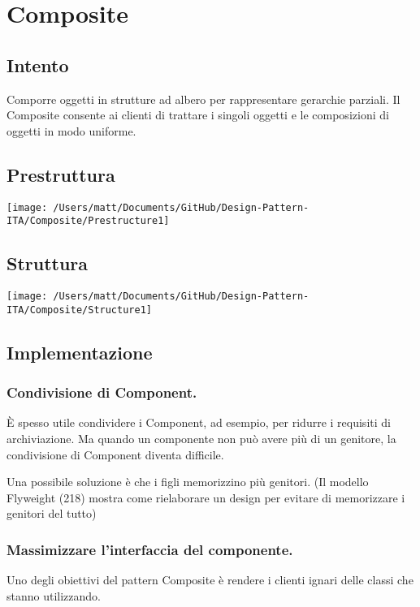 \chapter{Composite}
\section{Intento}

Comporre oggetti in strutture ad albero per rappresentare gerarchie parziali. Il Composite consente ai clienti di trattare i singoli oggetti e le composizioni di oggetti in modo uniforme.


\section{Prestruttura}

\texttt{[image: /Users/matt/Documents/GitHub/Design-Pattern-ITA/Composite/Prestructure1]}


\section{Struttura}

\texttt{[image: /Users/matt/Documents/GitHub/Design-Pattern-ITA/Composite/Structure1]}


\section{Implementazione}

\subsection{Condivisione di Component.}
È spesso utile condividere i Component, ad esempio, per ridurre i requisiti di archiviazione. Ma quando un componente non può avere più di un genitore, la condivisione di Component diventa difficile.

Una possibile soluzione è che i figli memorizzino più genitori. (Il modello Flyweight (218) mostra come rielaborare un design per evitare di memorizzare i genitori del tutto)

\subsection{Massimizzare l'interfaccia del componente.}
Uno degli obiettivi del pattern Composite è rendere i clienti ignari delle classi che stanno utilizzando.

